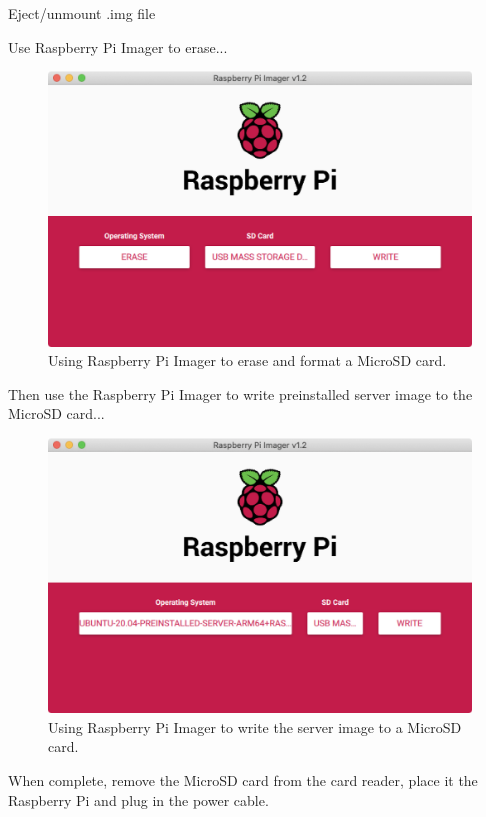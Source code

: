 \documentclass{article}
\begin{document}
Eject/unmount .img file

Use Raspberry Pi Imager to erase...

\begin{figure}
	\centering	
	\includegraphics[width=1.0\textwidth]{screenshots/imager-erase.png}
	\caption{Using Raspberry Pi Imager to erase and format a MicroSD card.}
\end{figure}

Then use the Raspberry Pi Imager to write preinstalled server image to the MicroSD card...

\begin{figure}
	\centering	
	\includegraphics[width=1.0\textwidth]{screenshots/imager-write.png}
	\caption{Using Raspberry Pi Imager to write the server image to a MicroSD card.}
\end{figure}

When complete, remove the MicroSD card from the card reader, place it the Raspberry Pi and plug in the power cable.
\end{document}
